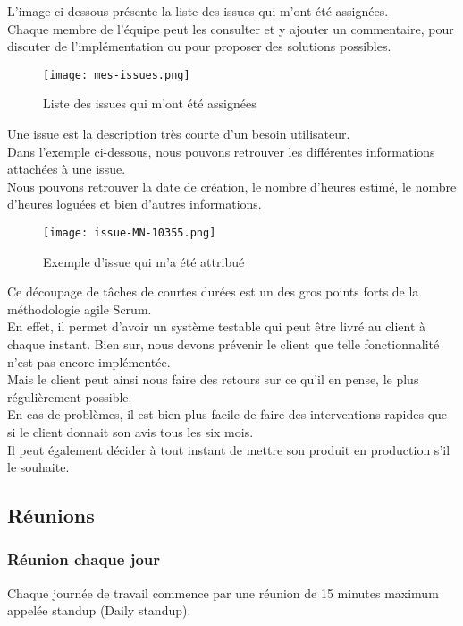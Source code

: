 L'image ci dessous présente la liste des issues qui m'ont été
assignées. \\
Chaque membre de l'équipe peut les consulter et y ajouter un
commentaire, pour discuter de l'implémentation ou pour proposer des
solutions possibles.

\begin{figure}[H]
  \texttt{[image: mes-issues.png]}
  \caption{Liste des issues qui m'ont été assignées}
\end{figure}

\clearpage

Une issue est la description très courte d'un besoin utilisateur.\\
Dans l'exemple ci-dessous, nous pouvons retrouver les différentes informations
attachées à une issue. \\
Nous pouvons retrouver la date de création, le nombre d'heures estimé, le nombre
d'heures loguées et bien d'autres informations.\\

\begin{figure}[H]
  \texttt{[image: issue-MN-10355.png]}
  \caption{Exemple d'issue qui m'a été attribué}
\end{figure}

Ce découpage de tâches de courtes durées est un des gros points forts de la
méthodologie agile Scrum.\\
En effet, il permet d'avoir un système testable qui peut être livré au client à
chaque instant. Bien sur, nous devons prévenir le client que telle
fonctionnalité n'est pas encore implémentée.\\
Mais le client peut ainsi nous faire des retours sur ce qu'il en pense, le plus
régulièrement possible.\\
En cas de problèmes, il est bien plus facile de faire des interventions rapides
que si le client donnait son avis tous les six mois.\\
Il peut également décider à tout instant de mettre son produit en production
s'il le souhaite.

\subsection{Réunions}
\subsubsection{Réunion chaque jour}
Chaque journée de travail commence par une réunion de 15 minutes maximum appelée
standup (Daily standup).\\

